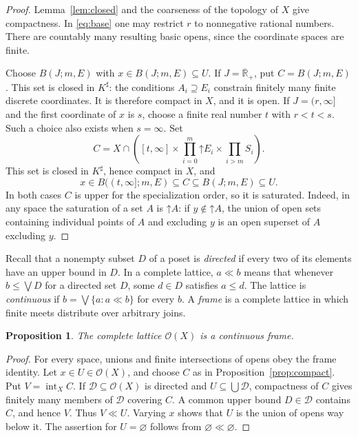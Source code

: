 \documentclass[11pt]{amsart}
\newtheorem{proposition}[theorem]{Proposition}
\theoremstyle{definition}
\theoremstyle{remark}
\numberwithin{equation}{section}
\newcommand{\OO}{\mathcal O}
\newcommand{\RR}{\overline{\mathbb R}_{+}}
\newcommand{\up}{\mathord\uparrow}
\newcommand{\intr}{\operatorname{int}}
\begin{document}
\begin{proof}
Lemma~\ref{lem:closed} and the coarseness of the topology of $X$
give compactness. In \eqref{eq:base} one may restrict $r$ to
nonnegative rational numbers. There are countably many resulting
basic opens, since the coordinate spaces are finite.

Choose $B(J;m,E)$ with $x\in B(J;m,E)\subseteq U$.
If $J=\RR$, put $C=B(J;m,E)$. This set is closed in $K^{\sharp}$:
the conditions $A_i\supseteq E_i$ constrain finitely many finite
discrete coordinates. It is therefore compact in $X$, and it is open.
If $J=(r,\infty]$ and the first coordinate of $x$ is $s$, choose a
finite real number $t$ with $r<t<s$. Such a choice also exists when
$s=\infty$. Set
\[
C=X\cap\left([t,\infty]\times\prod_{i=0}^{m}\up E_i
                               \times\prod_{i>m}S_i\right).
\]
This set is closed in $K^{\sharp}$, hence compact in $X$, and
\[
x\in B((t,\infty];m,E)\subseteq C\subseteq B(J;m,E)\subseteq U.
\]
In both cases $C$ is upper for the specialization order, so it is
saturated. Indeed, in any space the saturation of a set $A$ is
$\up A$: if $y\notin\up A$, the union of open sets containing
individual points of $A$ and excluding $y$ is an open superset
of $A$ excluding $y$.
\end{proof}

Recall that a nonempty subset $D$ of a poset is \emph{directed}
if every two of its elements have an upper bound in $D$.
In a complete lattice, $a\ll b$ means that whenever
$b\leq\bigvee D$ for a directed set $D$, some $d\in D$ satisfies
$a\leq d$. The lattice is \emph{continuous} if
$b=\bigvee\{a:a\ll b\}$ for every $b$. A \emph{frame} is a
complete lattice in which finite meets distribute over arbitrary joins.

\begin{proposition}\label{prop:frame}
The complete lattice $\OO(X)$ is a continuous frame.
\end{proposition}

\begin{proof}
For every space, unions and finite intersections of opens obey
the frame identity. Let $x\in U\in\OO(X)$, and choose $C$ as in
Proposition~\ref{prop:compact}. Put $V=\intr_X C$.
If $\mathcal D\subseteq\OO(X)$ is directed and
$U\subseteq\bigcup\mathcal D$, compactness of $C$ gives finitely
many members of $\mathcal D$ covering $C$. A common upper bound
$D\in\mathcal D$ contains $C$, and hence $V$.
Thus $V\ll U$. Varying $x$ shows that $U$ is the union of opens
way below it. The assertion for $U=\varnothing$ follows from
$\varnothing\ll\varnothing$.
\end{proof}
\end{document}
